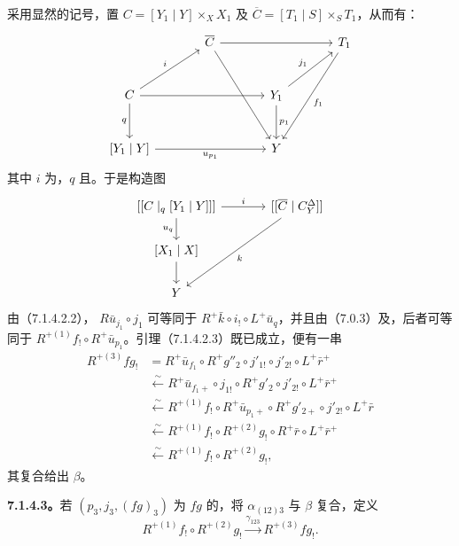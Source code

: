 采用显然的记号，置 $C=[Y_1\mid Y]\times_X X_1$ 及 $\overline C=[T_1\mid S]\times_S T_1$，从而有：
\[
\begin{tikzcd}[column sep=large,row sep=large]
&\overline C\arrow[rr]\arrow[ddr]&&T_1\arrow[ddl,"f_1"]\\
C\arrow[ur,"i"]\arrow[rr]\arrow[d,"q"']&&Y_1\arrow[ur,"j_1"]\arrow[d,"p_1"]&\\
{[Y_1\mid Y]}\arrow[rr,"u_{p_1}"']&&Y&
\end{tikzcd}
\]
其中 $i$ 为，$q$ 且。于是构造图
\[
\begin{tikzcd}[column sep=large]
{[[C\mid_q[Y_1\mid Y]]]}\arrow[r,"i"]\arrow[d,"u_q"']&{[[\overline C\mid C_Y^\Delta]]}\arrow[ddl,"k"]\\
{[X_1\mid X]}\arrow[d]&\\
Y&
\end{tikzcd}
\]
由（7.1.4.2.2）， $R\bar u_{j_1}\circ j_1$ 可等同于 $R^+\bar k\circ i_!\circ L^+\bar u_q$，并且由（7.0.3）及，后者可等同于 $R^{+(1)}f_!\circ R^+\bar u_{p_1}$。引理（7.1.4.2.3）既已成立，便有一串
\[
\begin{aligned}
R^{+(3)}fg_!&=R^+\bar u_{f_1}\circ R^+g''_2\circ j'_{1!}\circ j'_{2!}\circ L^+\bar r^+\\
&\xleftarrow\sim R^+\bar u_{f_1+}\circ j_{1!}\circ R^+g'_2\circ j'_{2!}\circ L^+\bar r^+\\
&\xleftarrow\sim R^{+(1)}f_!\circ R^+\bar u_{p_1+}\circ R^+g'_{2+}\circ j'_{2!}\circ L^+\bar r\\
&\xleftarrow\sim R^{+(1)}f_!\circ R^{+(2)}g_!\circ R^+\bar r\circ L^+\bar r^+\\
&\xleftarrow\sim R^{+(1)}f_!\circ R^{+(2)}g_!,
\end{aligned}
\]
其复合给出 $\beta$。

\textbf{7.1.4.3。}若 $(p_3,j_3,(fg)_3)$ 为 $fg$ 的，将 $\alpha_{(12)3}$ 与 $\beta$ 复合，定义
\[R^{+(1)}f_!\circ R^{+(2)}g_!\xrightarrow{\gamma_{123}}R^{+(3)}fg_!.\]

